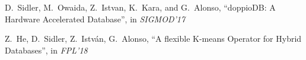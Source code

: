 \documentclass[11pt,dvipdfm]{article}
\begin{document}
\begin{thebibliography}{10}
\begin{small}
{D.~Sidler, M.~Owaida, Z.~Istvan, K.~Kara, and G.~Alonso}, ``doppioDB: A Hardware Accelerated Database'', in {\em SIGMOD'17}

{Z.~He, D.~Sidler, Z.~Istv{\'a}n, G.~Alonso},
``A flexible K-means Operator for Hybrid Databases'', in {\em FPL'18}



\end{small}
\end{thebibliography}
\end{document}
